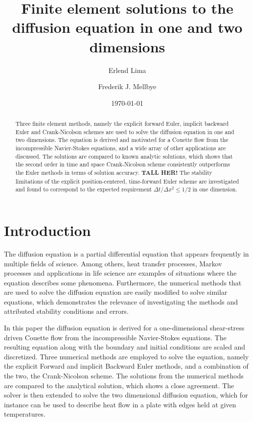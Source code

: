 \documentclass[aps,reprint]{revtex4-1}
\begin{document}
\title{Finite element solutions to the diffusion equation in one and two dimensions}
\author{Erlend Lima}
\author{Frederik J. Mellbye}
\date{\today}

\begin{abstract}
Three finite element methods, namely the explicit forward Euler, implicit backward Euler
and Crank-Nicolson schemes are used to solve the diffusion equation in one and
two dimensions. The equation is derived and motivated for a Couette flow from the
incompressible Navier-Stokes equations, and a wide array of other applications
are discussed. The solutions are compared to known analytic solutions, which shows
that the second order in time and space Crank-Nicolson scheme consistently outperforms
the Euler methods in terms of solution accuracy. \textbf{TALL HER!} The stability limitations of the
explicit position-centered, time-forward Euler scheme are investigated and found to
correspond to the expected requirement $\Delta{t}/\Delta{x}^2 \leq 1/2$ in one dimension.
\end{abstract}
\maketitle
\tableofcontents
\makeatletter
\let\toc@pre\relax
\let\toc@post\relax
\makeatother

\newpage

\section{Introduction} \label{sec:introduction}
The diffusion equation is a partial differential equation that appears frequently in
multiple fields of science. Among others, heat transfer processes, Markov processes
and applications in life science are examples of situations where the equation describes
some phenomena. Furthermore, the numerical methods that are used to solve the diffusion
equation are easily modified to solve similar equations, which demonstrates the relevance
of investigating the methods and attributed stability conditions and errors.

In this paper the diffusion equation is derived for a one-dimensional shear-stress
driven Couette flow from the incompressible Navier-Stokes equations. The resulting
equation along with the boundary and initial conditions are scaled and discretized.
Three numerical methods are employed to solve the equation, namely the explicit Forward and
implicit Backward Euler methods, and a combination of the two, the Crank-Nicolson scheme.
The solutions from the numerical methods are compared to the analytical solution, which
shows a close agreement. The solver is then extended to solve the two dimensional
diffusion equation, which for instance can be used to describe heat flow in a
plate with edges held at given temperatures.
\end{document}
